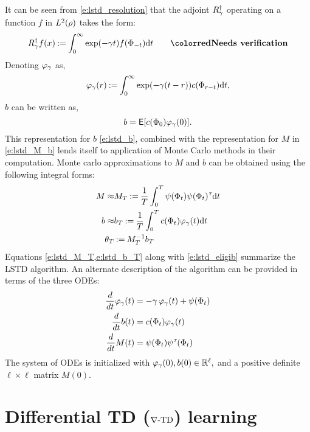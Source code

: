 It can be seen from \eqref{e:lstd_resolution} that the adjoint $R^\dagger_\gamma$ operating on a function $f$ in $L^2(\rho)$ takes the form:
\[
R^\dagger_\discount f(x) \eqdef \int_0^\infty \exp(-\discount t ) f(\markovstate_{-t}) \ud t \qquad \textbf{\rd{Needs verification}}
\]
Denoting $\varphi_\gamma$ as,
\begin{equation}
\eligibvector_\discount(r) \eqdef \int_0^\infty \exp(-\discount (t -r)) c(\markovstate_{r-t}) \ud t,
\label{e:lstd_eligib}
\end{equation}
$b$ can be written as,
\begin{equation}
b = \Expect[c(\markovstate_0) \eligibvector_\discount(0)].
\label{e:lstd_b}
\end{equation}
This representation for $b$ \eqref{e:lstd_b}, combined with the representation for $M$ in \eqref{e:lstd_M_b} lends itself to application of Monte Carlo methods in their computation. Monte carlo approximations to $M$ and $b$ can be obtained using the following integral forms:
\begin{subequations}
\begin{align}
M \approx &M_T   \eqdef \frac{1}{T} \int_0^T  \basis(\markovstate_t) \basis(\markovstate_t)^\transpose \ud t
\label{e:lstd_M_T}
\\
b \approx & b_T  \eqdef \frac{1}{T} \int_0^T c(\markovstate_t) \eligibvector_\discount(t) \ud t
\label{e:lstd_b_T}
\\
\param_T &\eqdef  M_T^{-1} b_T
\label{e:lstd_theta_T}
\end{align}
\end{subequations}
Equations \cref{e:lstd_M_T,e:lstd_b_T} along with \eqref{e:lstd_eligib} summarize the LSTD algorithm. An alternate description of the algorithm can be provided in terms of the three ODEs:
\begin{subequations}
\begin{align}
\ddt \eligibvector_\discount (t) &= - \discount\, \eligibvector_\discount(t) + \basis (\markovstate_t) 
\label{e:lstd_ode_eligib} \\
\ddt b(t) &=  c(\markovstate_t)\eligibvector_\discount(t)
 \label{e:lstd_ode_b}\\
\ddt M(t) &= \basis(\markovstate_t) \basis^\transpose(\markovstate_t) 
\label{e:lstd_ode_M}
\end{align}
\end{subequations}
The system of ODEs is initialized with $\varphi_\gamma(0), b(0) \in \mathbb{R}^\ell,$ and a positive definite $\ell \times \ell$ matrix $M(0)$. 

\section{Differential TD ($\nabla\text{-TD}$) learning}
\label{diff_td_learning}


